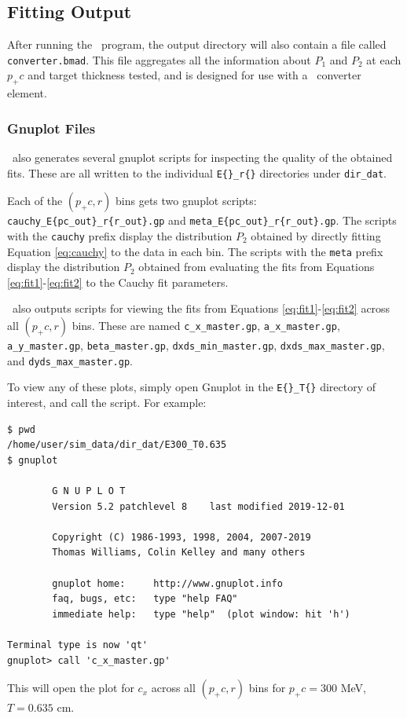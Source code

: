 \documentclass[12pt]{article}
\begin{document}
\subsection{Fitting Output}

After running the \exef \, program, the output directory will also contain a file called \texttt{converter.bmad}.
This file aggregates all the information about $P_1$ and $P_2$ at each $p_+ c$ and target thickness tested, and is designed for use with a \bmad \, converter element.

\subsubsection{Gnuplot Files}

\exef \, also generates several gnuplot scripts for inspecting the quality of the obtained fits.
These are all written to the individual \texttt{E\{\}\_r\{\}} directories under \texttt{dir\_dat}.

Each of the $(p_+ c, r)$ bins gets two gnuplot scripts: \texttt{cauchy\_E\{pc\_out\}\_r\{r\_out\}.gp} and \texttt{meta\_E\{pc\_out\}\_r\{r\_out\}.gp}.
The scripts with the \texttt{cauchy} prefix display the distribution $P_2$ obtained by directly fitting Equation \ref{eq:cauchy} to the data in each bin.
The scripts with the \texttt{meta} prefix display the distribution $P_2$ obtained from evaluating the fits from Equations \ref{eq:fit1}-\ref{eq:fit2} to the Cauchy fit parameters.

\exef \, also outputs scripts for viewing the fits from Equations \ref{eq:fit1}-\ref{eq:fit2} across all $(p_+ c, r)$ bins.
These are named \texttt{c\_x\_master.gp},
\texttt{a\_x\_master.gp},
\texttt{a\_y\_master.gp},
\texttt{beta\_master.gp},
\texttt{dxds\_min\_master.gp},
\texttt{dxds\_max\_master.gp},
and \texttt{dyds\_max\_master.gp}.

To view any of these plots, simply open Gnuplot in the \texttt{E\{\}\_T\{\}} directory of interest, and call the script.
For example:
\begin{verbatim}
$ pwd
/home/user/sim_data/dir_dat/E300_T0.635
$ gnuplot

        G N U P L O T
        Version 5.2 patchlevel 8    last modified 2019-12-01

        Copyright (C) 1986-1993, 1998, 2004, 2007-2019
        Thomas Williams, Colin Kelley and many others

        gnuplot home:     http://www.gnuplot.info
        faq, bugs, etc:   type "help FAQ"
        immediate help:   type "help"  (plot window: hit 'h')

Terminal type is now 'qt'
gnuplot> call 'c_x_master.gp'
\end{verbatim}
This will open the plot for $c_x$ across all $(p_+ c, r)$ bins for $p_+ c = 300$ MeV, $T = 0.635$ cm.
\end{document}
